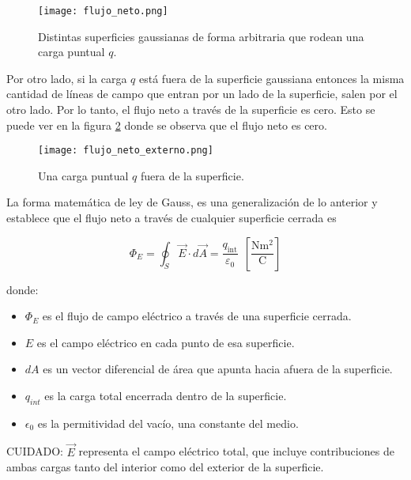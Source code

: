 \begin{figure}[ht]
    \centering
    \texttt{[image: flujo\_neto.png]}
    \caption{Distintas superficies gaussianas de forma arbitraria que rodean una carga puntual \(q\).}
    \label{fig:superficie_gaussiana_arbitraria}
\end{figure}

Por otro lado, si la carga \(q\) está fuera de la superficie gaussiana entonces la misma cantidad de líneas de campo que entran por un lado de la superficie, salen por el otro lado. Por lo tanto, el flujo neto a través de la superficie es cero. Esto se puede ver en la figura \ref{fig:flujo_neto_2} donde se observa que el flujo neto es cero.

\begin{figure}[ht]
    \centering
    \texttt{[image: flujo\_neto\_externo.png]}
    \caption{Una carga puntual \(q\) fuera de la superficie.}
    \label{fig:flujo_neto_2}
\end{figure}

La forma matemática de ley de Gauss, es una generalización de lo anterior y establece que el flujo neto a través de cualquier superficie cerrada es

\begin{equation}
    \Phi_E = \oint_{S} \vec{E} \cdot d\vec{A} = \frac{q_{\text{int}}}{\varepsilon_0} ~~ \left[\frac{\si{\newton \meter \squared}}{\si{\coulomb}}\right]
\end{equation}

donde:
\begin{itemize}
    \item \( \Phi_E \) es el flujo de campo eléctrico a través de una superficie cerrada.
    \item \(E\) es el campo eléctrico en cada punto de esa superficie.
    \item \(dA\) es un vector diferencial de área que apunta hacia afuera de la superficie.
    \item \(q_{int}\) es la carga total encerrada dentro de la superficie.
    \item \(\epsilon_0\) es la permitividad del vacío, una constante del medio.
\end{itemize}

\begin{tcolorbox}[mydanger]
    CUIDADO: \(\vec{E}\) representa el campo eléctrico total, que incluye contribuciones de ambas cargas tanto del interior como del exterior de la superficie.    
\end{tcolorbox}

